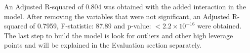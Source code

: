 An Adjusted R-squared of 0.804 was obtained with the added interaction in the model. After removing the variables that were not significant, an Adjusted R-squared of 0.7959, F-statistic: 87.89 and p-value: $< 2.2\times 10^{-16}$ were obtained. The last step to build the model is look for outliers and other high leverage points and will be explained in the Evaluation section separately.


